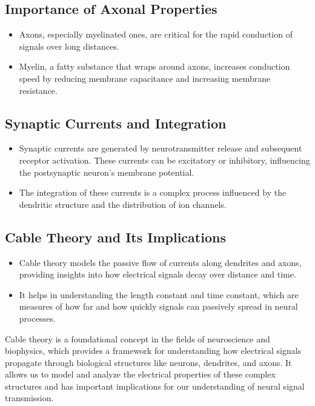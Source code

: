 \documentclass{article}
\begin{document}
\subsection{Importance of Axonal Properties}
\begin{itemize}
    \item Axons, especially myelinated ones, are critical for the rapid conduction of signals over long distances.
    \item Myelin, a fatty substance that wraps around axons, increases conduction speed by reducing membrane capacitance and increasing membrane resistance.
\end{itemize}

\subsection{Synaptic Currents and Integration}
\begin{itemize}
    \item Synaptic currents are generated by neurotransmitter release and subsequent receptor activation. These currents can be excitatory or inhibitory, influencing the postsynaptic neuron's membrane potential.
    \item The integration of these currents is a complex process influenced by the dendritic structure and the distribution of ion channels.
\end{itemize}

\subsection{Cable Theory and Its Implications}
\begin{itemize}
    \item Cable theory models the passive flow of currents along dendrites and axons, providing insights into how electrical signals decay over distance and time.
    \item It helps in understanding the length constant and time constant, which are measures of how far and how quickly signals can passively spread in neural processes.
\end{itemize}


Cable theory is a foundational concept in the fields of neuroscience and biophysics, which provides a framework for understanding how electrical signals propagate through biological structures like neurons, dendrites, and axons. It allows us to model and analyze the electrical properties of these complex structures and has important implications for our understanding of neural signal transmission.
\end{document}

